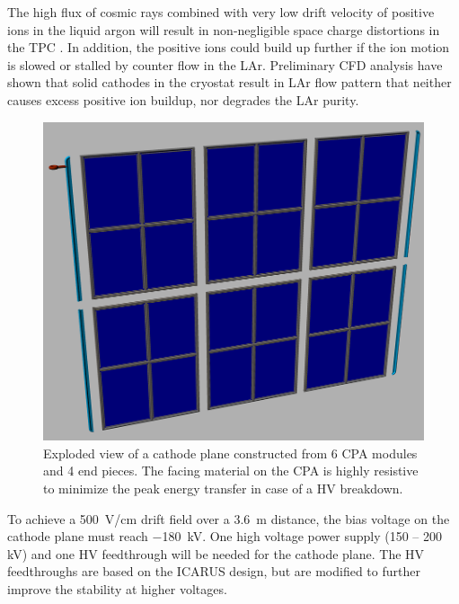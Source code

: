 
The high flux of cosmic rays combined with very low drift velocity of positive ions in the liquid argon will result in non-negligible space charge distortions in the TPC \cite{spacecharge}.  In addition, the positive ions could build up further if the ion motion is slowed or stalled by counter flow in the LAr.  Preliminary CFD analysis \cite{CFD} have shown that solid cathodes in the cryostat result in LAr flow pattern that neither causes excess positive ion buildup, nor degrades the LAr purity.


\begin{figure}[t]
\centering
\includegraphics[width=5in]{figures/TPC_CPA_1}
\caption{Exploded view of a cathode plane constructed from 6 CPA modules and 4 end pieces. The facing material on the CPA is highly resistive to minimize the peak energy transfer in case of a HV breakdown.}
\label{fig:tpc_cpa_1}
\end{figure}

To achieve a 500~V/cm drift field over a 3.6~m distance, the bias 
voltage on the cathode plane must reach $-$180~kV. One high voltage power supply (150 -- 200 kV) and one HV feedthrough will be needed for the cathode plane.  The HV feedthroughs are based on the ICARUS design, but are modified to further improve the stability at higher voltages. %

